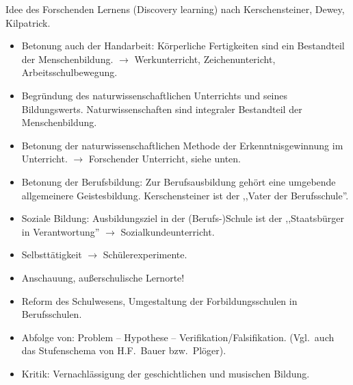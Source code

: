 \bip
Idee des Forschenden Lernens (Discovery learning) nach Kerschensteiner, Dewey, Kilpatrick.
\begin{itemize}
\item Betonung auch der Handarbeit: K\"{o}rperliche Fertigkeiten sind
ein Bestandteil der Menschenbildung.
$\to$ Werkunterricht, Zeichenuntericht, Arbeitsschulbewegung.
\item Begr\"{u}ndung des naturwissenschaftlichen Unterrichts und
seines Bildungswerts.
Naturwissenschaften sind integraler Bestandteil der Menschenbildung.
\item Betonung der naturwissenschaftlichen Methode der
Erkenntnisgewinnung im Unterricht.
$\to$ Forschender Unterricht, siehe unten.
\item Betonung der Berufsbildung: Zur Berufsausbildung geh\"{o}rt
eine umgebende allgemeinere Geistesbildung.
Kerschensteiner ist der ,,Vater der Berufsschule''.
\item Soziale Bildung: Ausbildungsziel in der (Berufs-)Schule ist
der ,,Staatsb\"{u}rger in Verantwortung'' $\to$ Sozialkundeunterricht.
\item Selbstt\"{a}tigkeit  $\to $ Sch\"{u}lerexperimente.
\item Anschauung, au{\ss}erschulische Lernorte!
\item Reform des Schulwesens, Umgestaltung der Forbildungsschulen
in Berufsschulen.
\item Abfolge von: Problem -- Hypothese -- Verifikation/Falsifikation.
(Vgl.\ auch das Stufenschema von H.F.\ Bauer bzw.\ Pl\"{o}ger).
\item Kritik: Vernachl\"{a}ssigung der geschichtlichen und
musischen Bildung.
\end{itemize}


\bip\bip
